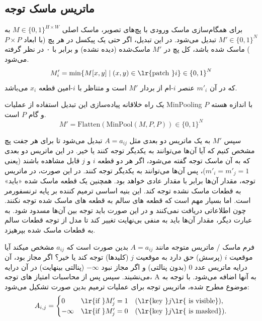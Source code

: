 \subsection{ماتریس ماسک توجه}


برای همگام‌سازی ماسک ورودی با پچ‌های تصویر، ماسک اصلی 
$ M \in \{0,1\}^{H \times W} $
به
$ M' \in \{0,1\}^{N} $
 تبدیل می‌شود. در این تبدیل، اگر حتی یک پیکسل در هر پچ (با ابعاد \( P \times P \)) ماسک شده باشد، کل پچ در \( M' \) ماسک‌شده (دیده نشده) و برابر با ۰ در نظر گرفته می‌شود.
$$
M'_i = \min \{ M[x, y] \mid (x, y) \in \text{\lr{patch }} i \} \in {\{0,1\}}^{N}
$$
که در آن $ m'_i $ عنصر $i$-ام از بردار  $M'$ است و متناظر با $i$-امین قطعه $ x_i$  می‌باشد.

یک راه خلاقانه پیاده‌سازی این تبدیل استفاده از عملیات MinPooling با اندازه هسته $P$ و گام $P$ است.
$$
M' = \text{Flatten}(\text{MinPool}(M, P, P)) \in {\{0,1\}}^{N}
$$


سپس $M'$ به یک ماتریس دو بعدی مثل $ A = a_{ij} $ تبدیل می‌شود تا برای هر جفت پچ مشخص کنیم که آیا آن‌ها می‌توانند به یکدیگر توجه کنند یا خیر. در این ماتریس دو بعدی که به آن ماسک توجه
 گفته می‌شود، اگر هر دو قطعه \( i \) و \( j \) قابل مشاهده باشند (یعنی \( m'_i = m'_j = 1 \))، پس آن‌ها می‌توانند به یکدیگر توجه کنند. در این صورت، در ماتریس توجه، مقدار آن‌ها برابر با مقدار عادی خواهد بود. همچنین یک قطعه ماسک شده «باید» به قطعات ماسک نشده توجه کند. این بنیه اساسی ترمیم کننده بر پایه ترنسفورمر است. اما بسیار مهم است که قطعه های سالم به قطعه های ماسک شده توجه نکنند. چون اطلاعاتی دریافت نمی‌کنند و در این صورت باید توجه بین آن‌ها مسدود شود. به عبارت دیگر، مقدار آن‌ها باید به منفی بی‌نهایت تغییر کند تا مدل از توجه قطعات سالم به قطعات ماسک شده بپرهیزد.
 
 فرم ماسک / ماتریس متوجه مانند $ A = a_{ij} $ بدین صورت است که $a_{ij}$ مشخص میکند آیا موقعیت $i$ (پرسش) حق دارد به موقعیت $j$ (کلیدها) توجه کند یا خیر؟ اگر مجاز بود، آن درایه ماتریس عدد 0 (بدون پنالتی) و اگر مجاز نبود $- \infty$ (پنالتی بینهایت) در آن درایه می‌نشیند. سپس پس از محاسبات امتیاز های توجه،‌ A به آنها اضافه می‌شود.
 با توجه به موضوع مطرح شده، ماتریس توجه برای عملیات ترمیم بدین صورت تشکیل می‌شود:
$$
  A_{i,j} = \begin{cases} 
	0 & \text{\lr{if }} M'_j = 1 \quad (\text{\lr{key }} j \text{\lr{ is visible}}), \\
	-\infty & \text{\lr{if }} M'_j = 0 \quad (\text{\lr{key }} j \text{\lr{ is masked}}).
\end{cases}
$$


